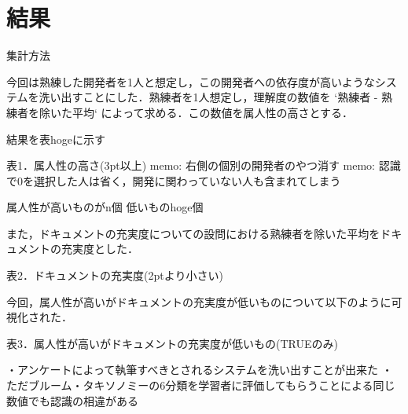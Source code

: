 \section{結果}
集計方法

今回は熟練した開発者を1人と想定し，この開発者への依存度が高いようなシステムを洗い出すことにした．熟練者を1人想定し，理解度の数値を `熟練者 - 熟練者を除いた平均` によって求める．この数値を属人性の高さとする．

結果を表hogeに示す

表1．属人性の高さ(3pt以上)
memo: 右側の個別の開発者のやつ消す
memo: 認識で0を選択した人は省く，開発に関わっていない人も含まれてしまう

属人性が高いものがn個
低いものhoge個

また，ドキュメントの充実度についての設問における熟練者を除いた平均をドキュメントの充実度とした．

表2．ドキュメントの充実度(2ptより小さい)

今回，属人性が高いがドキュメントの充実度が低いものについて以下のように可視化された．

表3．属人性が高いがドキュメントの充実度が低いもの(TRUEのみ)

・アンケートによって執筆すべきとされるシステムを洗い出すことが出来た
・ただブルーム・タキソノミーの6分類を学習者に評価してもらうことによる同じ数値でも認識の相違がある

